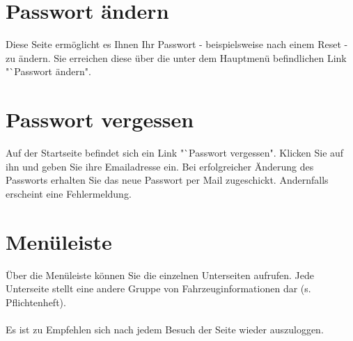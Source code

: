 \documentclass[fontsize = 12pt, paper = a4]{scrreprt}
\begin{document}
\section{Passwort ändern}

Diese Seite ermöglicht es Ihnen Ihr Passwort - beispielsweise nach einem Reset - zu ändern. Sie erreichen diese über die unter dem Hauptmenü befindlichen Link "`Passwort ändern".

\section{Passwort vergessen}

Auf der Startseite befindet sich ein Link "`Passwort vergessen". Klicken Sie auf ihn und geben Sie ihre Emailadresse ein. Bei erfolgreicher Änderung des Passworts erhalten Sie das neue Passwort per Mail zugeschickt. Andernfalls erscheint eine Fehlermeldung.

\section{Menüleiste}

Über die Menüleiste können Sie die einzelnen Unterseiten aufrufen. Jede Unterseite stellt eine andere Gruppe von Fahrzeuginformationen dar (s. Pflichtenheft). \\ \\

Es ist zu Empfehlen sich nach jedem Besuch der Seite wieder auszuloggen.



\listoffigures

\end{document}
